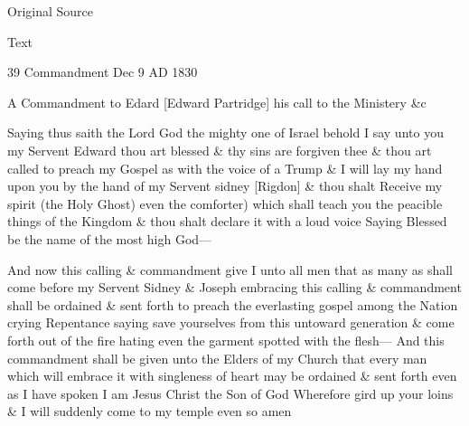 			
			\begin{description}
				\item[Original Source]
			\end{description}
			
			
			\begin{description}
				\item[Text]
			\end{description}
			
				\begin{tightcenter}
				39 Commandment Dec 9 AD 1830
				\end{tightcenter}
				
				A Commandment to Edard [Edward Partridge] his call to the Ministery \&c
				
				Saying thus saith the Lord God the mighty one of Israel behold I say unto you my Servent Edward thou art blessed \& thy sins are forgiven thee \& thou art called to preach my Gospel as with the voice of a Trump \& I will lay my hand upon you by the hand of my Servent sidney [Rigdon] \& thou shalt Receive my spirit (the Holy Ghost) even the comforter) which shall teach you the peacible things of the Kingdom \& thou shalt declare it with a loud voice Saying Blessed be the name of the most high God---
				
				And now this calling \& commandment give I unto all men that as many as shall come before my Servent Sidney \& Joseph embracing this calling \& commandment shall be ordained \& sent forth to preach the everlasting gospel among the Nation crying Repentance saying save yourselves from this untoward generation \& come forth out of the fire hating even the garment spotted with the flesh--- And this commandment shall be given unto the Elders of my Church that every man which will embrace it with singleness of heart may be ordained \& sent forth even as I have spoken I am Jesus Christ the Son of God Wherefore gird up your loins \& I will suddenly come to my temple even so amen
				
